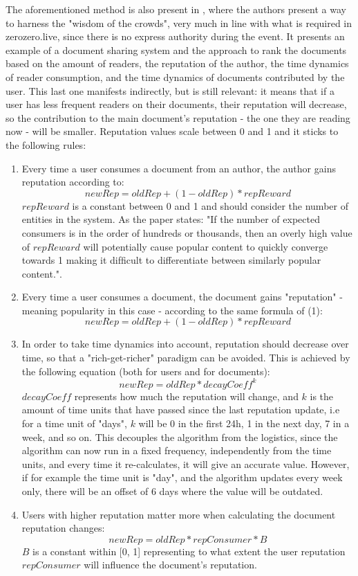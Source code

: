 The aforementioned method is also present in \cite{Daly2009}, where the authors present a way to harness the "wisdom of the crowds", very much in line with what is required in zerozero.live, since there is no express authority during the event. It presents an example of a document sharing system and the approach to rank the documents based on the amount of readers, the reputation of the author, the time dynamics of reader consumption, and the time dynamics of documents contributed by the user. This last one manifests indirectly, but is still relevant: it means that if a user has less frequent readers on their documents, their reputation will decrease, so the contribution to the main document's reputation - the one they are reading now - will be smaller.
Reputation values scale between 0 and 1 and it sticks to the following rules:
\begin{enumerate}
    \item Every time a user consumes a document from an author, the author gains reputation according to:
    \[newRep = oldRep + (1 - oldRep) * repReward\]
    $repReward$ is a constant between 0 and 1 and should consider the number of entities in the system. As the paper states: "If the number of expected consumers is in the order of hundreds or thousands, then an overly high value of $repReward$ will potentially cause popular content to quickly converge towards 1 making it difﬁcult to differentiate between similarly popular content.".
    \item Every time a user consumes a document, the document gains "reputation" - meaning popularity in this case - according to the same formula of (1):
    \[newRep = oldRep + (1 - oldRep) * repReward\]
    \item In order to take time dynamics into account, reputation should decrease over time, so that a "rich-get-richer" paradigm can be avoided. This is achieved by the following equation (both for users and for documents):
    \[newRep = oldRep * decayCoeff^k\]
    $decayCoeff$ represents how much the reputation will change, and $k$ is the amount of time units that have passed since the last reputation update, i.e for a time unit of "days", $k$ will be 0 in the first 24h, 1 in the next day, 7 in a week, and so on. This decouples the algorithm from the logistics, since the algorithm can now run in a fixed frequency, independently from the time units, and every time it re-calculates, it will give an accurate value. However, if for example the time unit is "day", and the algorithm updates every week only, there will be an offset of 6 days where the value will be outdated.
    \item Users with higher reputation matter more when calculating the document reputation changes:
    \[newRep = oldRep * repConsumer * B\]
    $B$ is a constant within [0, 1] representing to what extent the user reputation $repConsumer$ will influence the document's reputation.


\end{enumerate}
